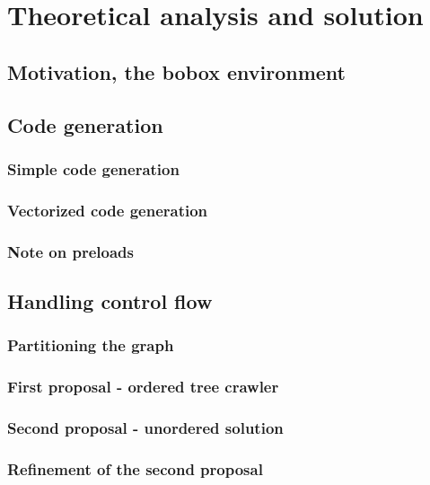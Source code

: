 \chapter{Theoretical analysis and solution}

    \section{Motivation, the bobox environment}

    \section{Code generation}

        \subsection{Simple code generation}

        \subsection{Vectorized code generation}

        \subsection{Note on preloads}

    \section{Handling control flow}

        \subsection{Partitioning the graph}

        \subsection{First proposal - ordered tree crawler}

        \subsection{Second proposal - unordered solution}

        \subsection{Refinement of the second proposal}

